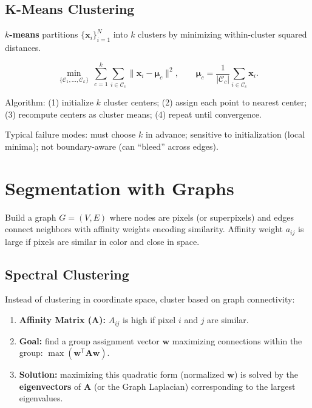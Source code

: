 \documentclass[11pt, oneside]{book}
\newcommand{\T}{^{\mathsf{T}}}
\newcommand{\vct}[1]{\bm{#1}}           %
\newcommand{\mat}[1]{\mathbf{#1}}       %
\begin{document}
\subsection{K-Means Clustering}

\begin{defbox}[title={K-Means}]
\textbf{$k$-means} partitions $\{\vct{x}_i\}_{i=1}^N$ into $k$ clusters by minimizing within-cluster squared distances.
\end{defbox}

\begin{thmbox}[title={K-Means Objective}]
\[
\min_{\{\mathcal{C}_1,\dots,\mathcal{C}_k\}} \ \sum_{c=1}^k \sum_{i\in\mathcal{C}_c} \|\vct{x}_i - \vct{\mu}_c\|^2,
\qquad
\vct{\mu}_c = \frac{1}{|\mathcal{C}_c|}\sum_{i\in\mathcal{C}_c}\vct{x}_i.
\]
\end{thmbox}

Algorithm: (1) initialize $k$ cluster centers; (2) assign each point to nearest center;
(3) recompute centers as cluster means; (4) repeat until convergence.

Typical failure modes: must choose $k$ in advance; sensitive to initialization (local minima); not boundary-aware
(can ``bleed'' across edges).

\section{Segmentation with Graphs}

\begin{defbox}[title={Graph-Based Segmentation}]
Build a graph $G=(V,E)$ where nodes are pixels (or superpixels) and edges connect neighbors with affinity weights
encoding similarity. Affinity weight $a_{ij}$ is large if pixels are similar in color and close in space.
\end{defbox}

\subsection{Spectral Clustering}

\begin{thmbox}[title={Spectral Clustering}]
Instead of clustering in coordinate space, cluster based on graph connectivity:
\begin{enumerate}
  \item \textbf{Affinity Matrix ($\mat{A}$):} $A_{ij}$ is high if pixel $i$ and $j$ are similar.
  \item \textbf{Goal:} find a group assignment vector $\vct{w}$ maximizing connections within the group: $\max (\vct{w}\T \mat{A}\vct{w})$.
  \item \textbf{Solution:} maximizing this quadratic form (normalized $\vct{w}$) is solved by the \textbf{eigenvectors} of $\mat{A}$ (or the Graph Laplacian) corresponding to the largest eigenvalues.
\end{enumerate}
\end{thmbox}
\end{document}
